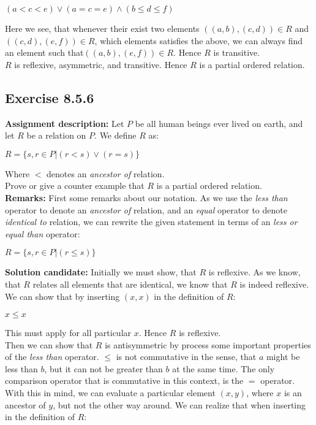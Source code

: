 \documentclass{report}
\newcommand{\cent}[1]{\begin{center}#1\end{center}}
\newcommand{\In}{\! \in \!}
\newcommand{\assignmentDescription}{\textbf{Assignment description: }}
\newcommand{\myRemark}{\textbf{Remarks: }}
\newcommand{\solution}{\textbf{Solution candidate: }}
\newcommand{\QED}{\boxed{}}
\newcommand{\Exercise}[1]{\subsection{Exercise #1}}
\begin{document}
	\cent{$(a < c < e) \vee (a = c = e) \wedge (b \leq d \leq f)$}
	
	Here we see, that whenever their exist two elements $((a,b),(c,d)) \In R$ and $((c,d),(e,f)) \In R$, which elements satisfies the above, we can always find an element such that$((a,b),(e,f)) \In R$. Hence $R$ is transitive.\\
	
	$R$ is reflexive, asymmetric, and transitive. Hence $R$ is a partial ordered relation.\\
	\QED
	
	\Exercise{8.5.6}
	
	\assignmentDescription
	Let $P$ be all human beings ever lived on earth, and let $R$ be a relation on $P$. We define $R$ as:
	
	\cent{$R = \{s,r \In P | (r < s) \vee (r = s)\}$}
	
	Where $<$ denotes an \textit{ancestor of} relation.\\
	
	Prove or give a counter example that $R$ is a partial ordered relation.\\
	
	\myRemark
	First some remarks about our notation. As we use the \textit{less than} operator to denote an \textit{ancestor of} relation, and an \textit{equal} operator to denote \textit{identical to} relation, we can rewrite the given statement in terms of an \textit{less or equal than} operator:
	
	\cent{$R = \{s,r \In P | (r \leq s)\}$}
	
	\solution
	Initially we must show, that $R$ is reflexive. As we know, that $R$ relates all elements that are identical, we know that $R$ is indeed reflexive. We can show that by inserting $ (x,x) $ in the definition of $R$:
	
	\cent{$x \leq x$}
	
	This must apply for all particular $x$. Hence $R$ is reflexive.\\
	
	Then we can show that $R$ is antisymmetric by process some important properties of the \textit{less than} operator. $\leq$ is not commutative in the sense, that $a$ might be less than $b$, but it can not be greater than $b$ at the same time. The only comparison operator that is commutative in this context, is the $=$ operator. With this in mind, we can evaluate a particular element $(x,y)$, where $x$ is an ancestor of $y$, but not the other way around. We can realize that when inserting in the definition of $R$:
	
\end{document}

